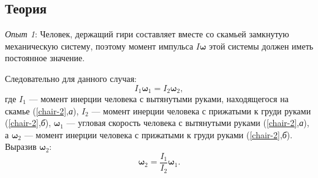 \documentclass[All.tex]{subfiles}
\begin{document}
	\subsection*{\textcolor{PineGreen}{Теория}}
	
\textit{Опыт 1}:
 Человек, держащий гири составляет вместе со скамьей замкнутую механическую систему, поэтому момент импульса $ I\bm{\omega} $ этой системы должен иметь постоянное значение.


 Следовательно для данного случая:
 \begin{equation}\label{chair-eq1}
 I_{1}\bm{\omega}_{1} =  I_{2}\bm{\omega}_{2},
 \end{equation} 
 где $ I_{1}  $ — момент инерции человека с вытянутыми руками, находящегося на скамье (\ref{chair-2},\textit{а}), $ I_{2}  $ — момент инерции человека с прижатыми к груди руками (\ref{chair-2},\textit{б}), $ \bm{\omega}_{1} $ — угловая скорость человека с вытянутыми руками (\ref{chair-2},\textit{а}), а $ \bm{\omega}_{2}  $ — момент инерции человека с прижатыми к груди руками (\ref{chair-2},\textit{б}).
 Выразив $ \bm{\omega}_{2} $:
 \begin{equation}\label{chair-eq2}
 \bm{\omega}_{2} =  \frac{I_{1}}{I_{2}}\bm{\omega}_{1}.
 \end{equation}
 
\end{document}
